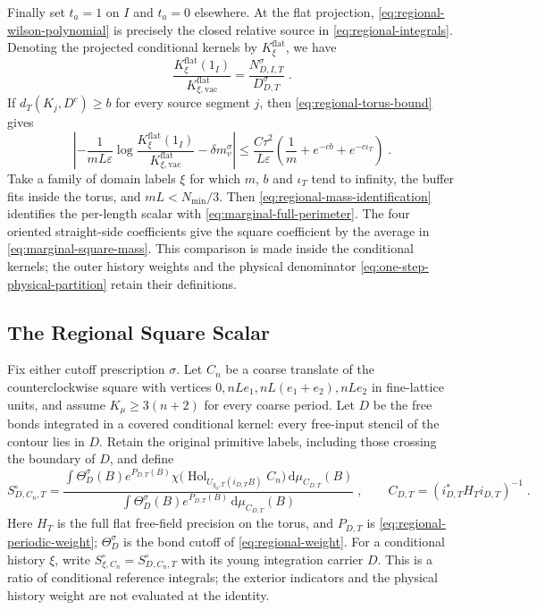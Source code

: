 \documentclass[11pt]{article}
\newcommand{\dd}{\mathrm{d}}
\newcommand{\Hol}{\operatorname{Hol}}
\begin{document}
Finally set $t_a=1$ on $I$ and $t_a=0$ elsewhere. At the flat projection, \eqref{eq:regional-wilson-polynomial} is precisely the closed relative source in \eqref{eq:regional-integrals}. Denoting the projected conditional kernels by $K_\xi^{\mathrm{flat}}$, we have
\begin{equation}\label{eq:regional-kernel-identification}
    \frac{K_\xi^{\mathrm{flat}}(1_I)}{K_{\xi,\mathrm{vac}}^{\mathrm{flat}}}
        =\frac{N_{D,I,T}^\sigma}{D_{D,T}^\sigma}\;.
\end{equation}
If $d_T(K_j,D^c)\geq b$ for every source segment $j$, then \eqref{eq:regional-torus-bound} gives
\begin{equation}\label{eq:regional-mass-identification}
    \left|-\frac{1}{mL\varepsilon}
        \log\frac{K_\xi^{\mathrm{flat}}(1_I)}
                    {K_{\xi,\mathrm{vac}}^{\mathrm{flat}}}
            -\delta m_v^\sigma\right|
        \leq\frac{C\tau^2}{L\varepsilon}
            \left(\frac{1}{m}+e^{-cb}+e^{-c\iota_T}\right)\;.
\end{equation}
Take a family of domain labels $\xi$ for which $m$, $b$ and $\iota_T$ tend to infinity, the buffer fits inside the torus, and $mL<N_{\min}/3$. Then \eqref{eq:regional-mass-identification} identifies the per-length scalar with \eqref{eq:marginal-full-perimeter}. The four oriented straight-side coefficients give the square coefficient by the average in \eqref{eq:marginal-square-mass}. This comparison is made inside the conditional kernels; the outer history weights and the physical denominator \eqref{eq:one-step-physical-partition} retain their definitions.

\subsection{The Regional Square Scalar}

Fix either cutoff prescription $\sigma$. Let $C_n$ be a coarse translate of the counterclockwise square with vertices $0,nLe_1,nL(e_1+e_2),nLe_2$ in fine-lattice units, and assume $K_\mu\geq 3(n+2)$ for every coarse period. Let $D$ be the free bonds integrated in a covered conditional kernel: every free-input stencil of the contour lies in $D$. Retain the original primitive labels, including those crossing the boundary of $D$, and define
\begin{equation}\label{eq:regional-square-scalar}
    S^\circ_{D,C_n,T}=
    \frac{\displaystyle\int\Theta_D^\sigma(B)e^{P_{D,T}(B)}
        \chi\bigl(\Hol_{U_{g_0,T}(i_{D,T}B)}C_n\bigr)\,\dd\mu_{C_{D,T}}(B)}
    {\displaystyle\int\Theta_D^\sigma(B)e^{P_{D,T}(B)}\,\dd\mu_{C_{D,T}}(B)}\;,
    \qquad C_{D,T}=(i_{D,T}^*H_Ti_{D,T})^{-1}\;.
\end{equation}
Here $H_T$ is the full flat free-field precision on the torus, and $P_{D,T}$ is \eqref{eq:regional-periodic-weight}; $\Theta_D^\sigma$ is the bond cutoff of \eqref{eq:regional-weight}. For a conditional history $\xi$, write $S^\circ_{\xi,C_n}=S^\circ_{D,C_n,T}$ with its young integration carrier $D$. This is a ratio of conditional reference integrals; the exterior indicators and the physical history weight are not evaluated at the identity.
\end{document}
